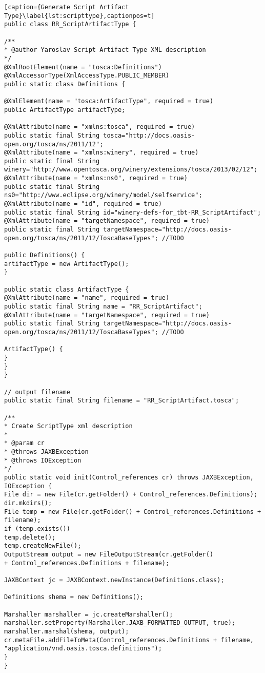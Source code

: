 
\begin{lstlisting}[caption={Generate Script Artifact Type}\label{lst:scripttype},captionpos=t] 
public class RR_ScriptArtifactType {

/**
* @author Yaroslav Script Artifact Type XML description
*/
@XmlRootElement(name = "tosca:Definitions")
@XmlAccessorType(XmlAccessType.PUBLIC_MEMBER)
public static class Definitions {

@XmlElement(name = "tosca:ArtifactType", required = true)
public ArtifactType artifactType;

@XmlAttribute(name = "xmlns:tosca", required = true)
public static final String tosca="http://docs.oasis-open.org/tosca/ns/2011/12";
@XmlAttribute(name = "xmlns:winery", required = true)
public static final String winery="http://www.opentosca.org/winery/extensions/tosca/2013/02/12";
@XmlAttribute(name = "xmlns:ns0", required = true)
public static final String ns0="http://www.eclipse.org/winery/model/selfservice";
@XmlAttribute(name = "id", required = true)
public static final String id="winery-defs-for_tbt-RR_ScriptArtifact";
@XmlAttribute(name = "targetNamespace", required = true)
public static final String targetNamespace="http://docs.oasis-open.org/tosca/ns/2011/12/ToscaBaseTypes"; //TODO

public Definitions() {
artifactType = new ArtifactType();
}

public static class ArtifactType {
@XmlAttribute(name = "name", required = true)
public static final String name = "RR_ScriptArtifact";
@XmlAttribute(name = "targetNamespace", required = true)
public static final String targetNamespace="http://docs.oasis-open.org/tosca/ns/2011/12/ToscaBaseTypes"; //TODO

ArtifactType() {
}
}
}

// output filename
public static final String filename = "RR_ScriptArtifact.tosca";

/**
* Create ScriptType xml description
* 
* @param cr
* @throws JAXBException
* @throws IOException
*/
public static void init(Control_references cr) throws JAXBException,
IOException {
File dir = new File(cr.getFolder() + Control_references.Definitions);
dir.mkdirs();
File temp = new File(cr.getFolder() + Control_references.Definitions + filename);
if (temp.exists())
temp.delete();
temp.createNewFile();
OutputStream output = new FileOutputStream(cr.getFolder()
+ Control_references.Definitions + filename);

JAXBContext jc = JAXBContext.newInstance(Definitions.class);

Definitions shema = new Definitions();

Marshaller marshaller = jc.createMarshaller();
marshaller.setProperty(Marshaller.JAXB_FORMATTED_OUTPUT, true);
marshaller.marshal(shema, output);
cr.metaFile.addFileToMeta(Control_references.Definitions + filename, "application/vnd.oasis.tosca.definitions");
}
}
\end{lstlisting}

